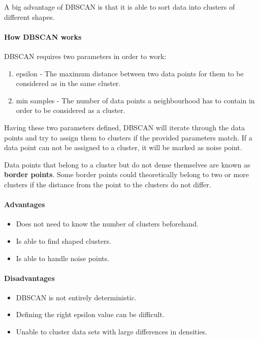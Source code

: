 A big advantage of DBSCAN is that it is able to sort data into clusters
of different shapes.

\paragraph{How DBSCAN works}
DBSCAN requires two parameters in order to work:

\begin{enumerate}
    \item epsilon - The maximum distance between two data points for them to be considered as in the same cluster.
    \item min samples - The number of data points a neighbourhood has to contain in order to be considered as a cluster.
\end{enumerate}

Having these two parameters defined, DBSCAN will iterate through the data points
and try to assign them to clusters if the provided parameters match.
If a data point can not be assigned to a cluster, it will be marked as noise point.

Data points that belong to a cluster but do not dense themselves are known as \textbf{border points}.
Some border points could theoretically belong to two or more clusters
if the distance from the point to the clusters do not differ.

\paragraph{Advantages}
\begin{itemize}
    \item Does not need to know the number of clusters beforehand.
    \item Is able to find shaped clusters.
    \item Is able to handle noise points.
\end{itemize}

\paragraph{Disadvantages}
\begin{itemize}
    \item DBSCAN is not entirely deterministic.
    \item Defining the right epsilon value can be difficult.
    \item Unable to cluster data sets with large differences in densities.
\end{itemize}

